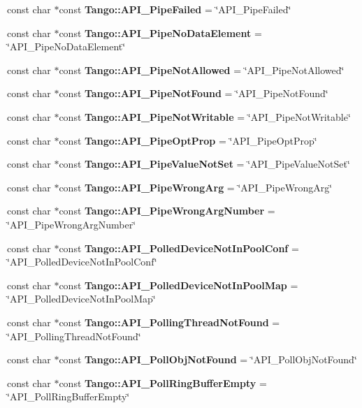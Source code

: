 \begin{DoxyCompactItemize}
\item 
const char $\ast$const {\bf Tango\-::\-A\-P\-I\-\_\-\-Pipe\-Failed} = \char`\"{}A\-P\-I\-\_\-\-Pipe\-Failed\char`\"{}
\item 
const char $\ast$const {\bf Tango\-::\-A\-P\-I\-\_\-\-Pipe\-No\-Data\-Element} = \char`\"{}A\-P\-I\-\_\-\-Pipe\-No\-Data\-Element\char`\"{}
\item 
const char $\ast$const {\bf Tango\-::\-A\-P\-I\-\_\-\-Pipe\-Not\-Allowed} = \char`\"{}A\-P\-I\-\_\-\-Pipe\-Not\-Allowed\char`\"{}
\item 
const char $\ast$const {\bf Tango\-::\-A\-P\-I\-\_\-\-Pipe\-Not\-Found} = \char`\"{}A\-P\-I\-\_\-\-Pipe\-Not\-Found\char`\"{}
\item 
const char $\ast$const {\bf Tango\-::\-A\-P\-I\-\_\-\-Pipe\-Not\-Writable} = \char`\"{}A\-P\-I\-\_\-\-Pipe\-Not\-Writable\char`\"{}
\item 
const char $\ast$const {\bf Tango\-::\-A\-P\-I\-\_\-\-Pipe\-Opt\-Prop} = \char`\"{}A\-P\-I\-\_\-\-Pipe\-Opt\-Prop\char`\"{}
\item 
const char $\ast$const {\bf Tango\-::\-A\-P\-I\-\_\-\-Pipe\-Value\-Not\-Set} = \char`\"{}A\-P\-I\-\_\-\-Pipe\-Value\-Not\-Set\char`\"{}
\item 
const char $\ast$const {\bf Tango\-::\-A\-P\-I\-\_\-\-Pipe\-Wrong\-Arg} = \char`\"{}A\-P\-I\-\_\-\-Pipe\-Wrong\-Arg\char`\"{}
\item 
const char $\ast$const {\bf Tango\-::\-A\-P\-I\-\_\-\-Pipe\-Wrong\-Arg\-Number} = \char`\"{}A\-P\-I\-\_\-\-Pipe\-Wrong\-Arg\-Number\char`\"{}
\item 
const char $\ast$const {\bf Tango\-::\-A\-P\-I\-\_\-\-Polled\-Device\-Not\-In\-Pool\-Conf} = \char`\"{}A\-P\-I\-\_\-\-Polled\-Device\-Not\-In\-Pool\-Conf\char`\"{}
\item 
const char $\ast$const {\bf Tango\-::\-A\-P\-I\-\_\-\-Polled\-Device\-Not\-In\-Pool\-Map} = \char`\"{}A\-P\-I\-\_\-\-Polled\-Device\-Not\-In\-Pool\-Map\char`\"{}
\item 
const char $\ast$const {\bf Tango\-::\-A\-P\-I\-\_\-\-Polling\-Thread\-Not\-Found} = \char`\"{}A\-P\-I\-\_\-\-Polling\-Thread\-Not\-Found\char`\"{}
\item 
const char $\ast$const {\bf Tango\-::\-A\-P\-I\-\_\-\-Poll\-Obj\-Not\-Found} = \char`\"{}A\-P\-I\-\_\-\-Poll\-Obj\-Not\-Found\char`\"{}
\item 
const char $\ast$const {\bf Tango\-::\-A\-P\-I\-\_\-\-Poll\-Ring\-Buffer\-Empty} = \char`\"{}A\-P\-I\-\_\-\-Poll\-Ring\-Buffer\-Empty\char`\"{}
\item 

\end{DoxyCompactItemize}
